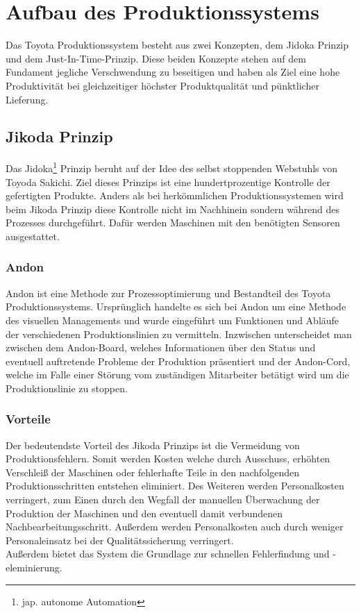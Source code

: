 \documentclass[00_ToyotaProduktionssystem.tex]{subfiles}
\begin{document}
\chapter{Aufbau des Produktionssystems}
\label{chap:AUFBAU}
Das Toyota Produktionssystem besteht aus zwei Konzepten, dem Jidoka Prinzip und dem Just-In-Time-Prinzip. Diese beiden Konzepte stehen auf dem Fundament jegliche Verschwendung zu beseitigen und haben als Ziel eine hohe Produktivität bei gleichzeitiger höchster Produktqualität und pünktlicher Lieferung.

\section{Jikoda Prinzip}
Das Jidoka\footnote{jap. autonome Automation} Prinzip beruht auf der Idee des selbst stoppenden Webstuhls von Toyoda Sakichi. Ziel dieses Prinzips ist eine hundertprozentige Kontrolle der gefertigten Produkte. Anders als bei herkömmlichen Produktionssystemen wird beim Jikoda Prinzip diese Kontrolle nicht im Nachhinein sondern während des Prozesses durchgeführt. Dafür werden Maschinen mit den benötigten Sensoren ausgestattet.

\subsection{Andon}
Andon ist eine Methode zur Prozessoptimierung und Bestandteil des Toyota Produktionssystems. Ursprünglich handelte es sich bei Andon um eine Methode des visuellen Managements und wurde eingeführt um Funktionen und Abläufe der verschiedenen Produktionslinien zu vermitteln. Inzwischen unterscheidet man zwischen dem Andon-Board, welches Informationen über den Status und eventuell auftretende Probleme der Produktion präsentiert und der Andon-Cord, welche im Falle einer Störung vom zuständigen Mitarbeiter betätigt wird um die Produktionslinie zu stoppen.

\subsection{Vorteile}
Der bedeutendste Vorteil des Jikoda Prinzips ist die Vermeidung von Produktionsfehlern. Somit werden Kosten   welche durch Ausschuss, erhöhten Verschleiß der Maschinen oder fehlerhafte Teile in den nachfolgenden Produktionsschritten entstehen eliminiert. Des Weiteren werden Personalkosten verringert, zum Einen durch den Wegfall der manuellen Überwachung der Produktion der Maschinen und den eventuell damit verbundenen Nachbearbeitungsschritt. Außerdem werden Personalkosten auch durch weniger Personaleinsatz bei der Qualitätssicherung verringert.\\
Außerdem bietet das System die Grundlage zur schnellen Fehlerfindung und -eleminierung.
\end{document}
